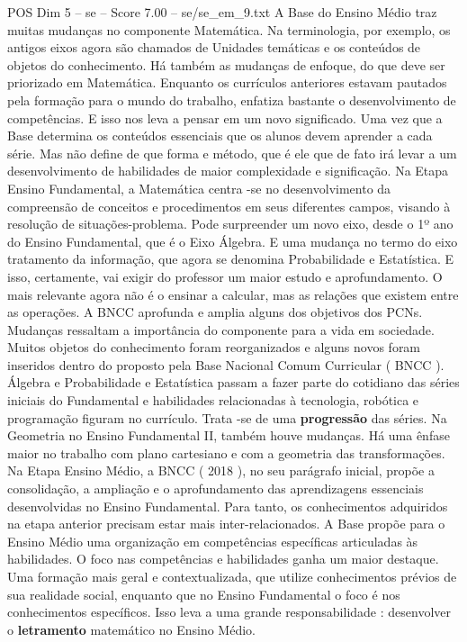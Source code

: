 \begin{textsample}{POS Dim 5 – se – Score 7.00 – se/se\_em\_9.txt}
A Base do Ensino Médio traz muitas mudanças no componente Matemática.
Na terminologia, por exemplo, os antigos eixos agora são chamados de Unidades temáticas e os conteúdos de objetos do conhecimento.
Há também as mudanças de enfoque, do que deve ser priorizado em Matemática.
Enquanto os currículos anteriores estavam pautados pela formação para o mundo do trabalho, enfatiza bastante o desenvolvimento de competências.
E isso nos leva a pensar em um novo significado.
Uma vez que a Base determina os conteúdos essenciais que os alunos devem aprender a cada série.
Mas não define de que forma e método, que é ele que de fato irá levar a um desenvolvimento de habilidades de maior complexidade e significação.
Na Etapa Ensino Fundamental, a Matemática centra -se no desenvolvimento da compreensão de conceitos e procedimentos em seus diferentes campos, visando à resolução de situações-problema.
Pode surpreender um novo eixo, desde o 1º ano do Ensino Fundamental, que é o Eixo Álgebra.
E uma mudança no termo do eixo tratamento da informação, que agora se denomina Probabilidade e Estatística.
E isso, certamente, vai exigir do professor um maior estudo e aprofundamento.
O mais relevante agora não é o ensinar a calcular, mas as relações que existem entre as operações.
A BNCC aprofunda e amplia alguns dos objetivos dos PCNs.
Mudanças ressaltam a importância do componente para a vida em sociedade.
Muitos objetos do conhecimento foram reorganizados e alguns novos foram inseridos dentro do proposto pela Base Nacional Comum Curricular ( BNCC ).
Álgebra e Probabilidade e Estatística passam a fazer parte do cotidiano das séries iniciais do Fundamental e habilidades relacionadas à tecnologia, robótica e programação figuram no currículo.
Trata -se de uma \textbf{progressão} das séries.
Na Geometria no Ensino Fundamental II, também houve mudanças.
Há uma ênfase maior no trabalho com plano cartesiano e com a geometria das transformações.
Na Etapa Ensino Médio, a BNCC ( 2018 ), no seu parágrafo inicial, propõe a consolidação, a ampliação e o aprofundamento das aprendizagens essenciais desenvolvidas no Ensino Fundamental.
Para tanto, os conhecimentos adquiridos na etapa anterior precisam estar mais inter-relacionados.
A Base propõe para o Ensino Médio uma organização em competências específicas articuladas às habilidades.
O foco nas competências e habilidades ganha um maior destaque.
Uma formação mais geral e contextualizada, que utilize conhecimentos prévios de sua realidade social, enquanto que no Ensino Fundamental o foco é nos conhecimentos específicos.
Isso leva a uma grande responsabilidade : desenvolver o \textbf{letramento} matemático no Ensino Médio.

\end{textsample}
